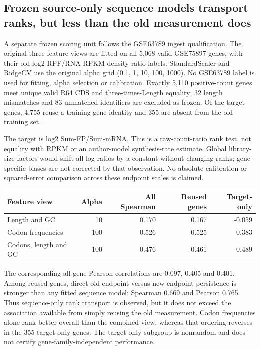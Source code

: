 \subsection{Frozen source-only sequence models transport ranks, but less than the old measurement does}
A separate frozen scoring unit follows the GSE63789 ingest qualification. The original three feature views are fitted on all 5,068 valid GSE75897 genes, with their old log2 RPF/RNA RPKM density-ratio labels. StandardScaler and RidgeCV use the original alpha grid (0.1, 1, 10, 100, 1000). No GSE63789 label is used for fitting, alpha selection or calibration. Exactly 5,110 positive-count genes meet unique valid R64 CDS and three-times-Length equality; 32 length mismatches and 83 unmatched identifiers are excluded as frozen. Of the target genes, 4,755 reuse a training gene identity and 355 are absent from the old training set.

The target is log2 Sum-FP/Sum-mRNA. This is a raw-count-ratio rank test, not equality with RPKM or an author-model synthesis-rate estimate. Global library-size factors would shift all log ratios by a constant without changing ranks; gene-specific biases are not corrected by that observation. No absolute calibration or squared-error comparison across these endpoint scales is claimed.

\begin{center}
\begin{tabular}{lrrrr}
\hline
Feature view & Alpha & All Spearman & Reused genes & Target-only \\
\hline
Length and GC & 10 & 0.170 & 0.167 & -0.059 \\
Codon frequencies & 100 & 0.526 & 0.525 & 0.383 \\
Codons, length and GC & 100 & 0.476 & 0.461 & 0.489 \\
\hline
\end{tabular}
\end{center}
The corresponding all-gene Pearson correlations are 0.097, 0.405 and 0.401. Among reused genes, direct old-endpoint versus new-endpoint persistence is stronger than any fitted sequence model: Spearman 0.669 and Pearson 0.765. Thus sequence-only rank transport is observed, but it does not exceed the association available from simply reusing the old measurement. Codon frequencies alone rank better overall than the combined view, whereas that ordering reverses in the 355 target-only genes. The target-only subgroup is nonrandom and does not certify gene-family-independent performance.

